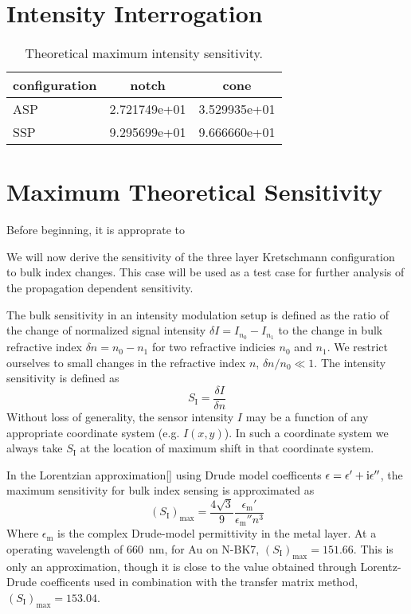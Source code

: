 \section{Intensity Interrogation}
\begin{table}
\centering
\begin{tabular}{lSS}
\toprule
{configuration} & {notch} & {cone} \\
\midrule
ASP & 2.721749e+01 & 3.529935e+01 \\
SSP & 9.295699e+01 & 9.666660e+01 \\
\bottomrule
\end{tabular}
\caption{Theoretical maximum intensity sensitivity.}
\label{tbl:intensitysens}
\end{table}


\section{Maximum Theoretical Sensitivity}
Before beginning, it is approprate to 

We will now derive the sensitivity of the three layer Kretschmann
configuration to bulk index changes. This case will be used as a test
case for further analysis of the propagation dependent sensitivity.

The bulk sensitivity in an intensity modulation setup is defined as
the ratio of the change of normalized signal intensity $\delta I=I_{n_{0}}-I_{n_{1}}$
to the change in bulk refractive index $\delta n=n_{0}-n_{1}$ for
two refractive indicies $n_{0}$ and $n_{1}$. We restrict ourselves
to small changes in the refractive index $n$, $\delta n/n_{0}\ll1$.
The intensity sensitivity is defined as
\begin{equation}
S_{\mathrm{I}}=\frac{\delta I}{\delta n}
\end{equation}
Without loss of generality, the sensor intensity $I$ may be a function
of any appropriate coordinate system (e.g. $I(x,y)$). In such a coordinate
system we always take $S_{\mathrm{I}}$ at the location of maximum
shift in that coordinate system.

In the Lorentzian approximation{[}{]} using Drude model coefficents
$\epsilon=\epsilon'+{\mathrm{i}}\epsilon''$, the maximum sensitivity for bulk
index sensing is approximated as
\begin{equation}
(S_{\text{I}})_{\text{max}}=\frac{4\sqrt{3}}{9}\frac{\epsilon_{\mathrm{m}}'}{\epsilon_{\mathrm{m}}''n^{3}}
\end{equation}
Where $\epsilon_{\mathrm{m}}$ is the complex Drude-model permittivity
in the metal layer. At a operating wavelength of \SI{660}{\nano\meter},
for Au on N-BK7, $(S_{\mathrm{I}})_{\text{max}}=151.66$. This is
only an approximation, though it is close to the value obtained through
Lorentz-Drude coefficents used in combination with the transfer matrix
method, $(S_{\mathrm{I}})_{\text{max}}=153.04$.
